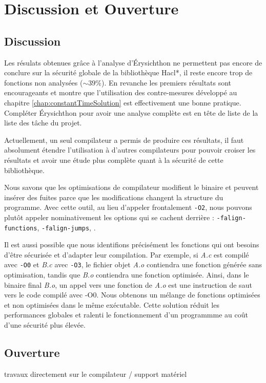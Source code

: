 \chapter*{Discussion et Ouverture}

\section*{Discussion}

Les résulats obtenues grâce à l'analyse d'Érysichthon ne permettent pas encore de conclure sur la sécurité globale de la bibliothèque Hacl*, il reste encore trop de fonctions non analysées ($\sim 39\%$). En revanche les premiers résultats sont encourageants et montre que l'utilisation des contre-mesures développé au chapitre \ref{chap:constantTimeSolution} est effectivement une bonne pratique. Compléter Érysichthon pour avoir une analyse complète est en tête de liste de la liste des tâche du projet.\medbreak

Actuellement, un seul compilateur a permis de produire ces résultats, il faut absolument étendre l'utilisation à d'autres compilateurs pour pouvoir croiser les résultats et avoir une étude plus complète quant à la sécurité de cette bibliothèque.\smallbreak

Nous savons que les optimisations de compilateur modifient le binaire et peuvent insérer des fuites parce que les modifications changent la structure du programme. Avec cette outil, au lieu d'appeler frontalement \texttt{-O2}, nous pouvons plutôt appeler nominativement les options qui se cachent derrière : \texttt{-falign-functions}, \texttt{-falign-jumps}, \etc.\smallbreak

Il est aussi possible que nous identifions précisément les fonctions qui ont besoins d'être sécurisée et d'adapter leur compilation. Par exemple, si \textit{A.c} est compilé avec \texttt{-O0} et \textit{B.c} avec \texttt{-O3}, le fichier objet \textit{A.o} contiendra une fonction générée sans optimisation, tandis que \textit{B.o} contiendra une fonction optimisée. Ainsi, dans le binaire final \textit{B.o}, un appel vers une fonction de \textit{A.o} est une instruction de saut vers le code compilé avec -O0. Nous obtenons un mélange de fonctions optimisées et non optimisées dans le même exécutable. Cette solution réduit les performances globales et ralenti le fonctionnement d'un programmme au coût d'une sécurité plus élevée.\smallbreak

\section*{Ouverture}




travaux directement sur le compilateur / support matériel